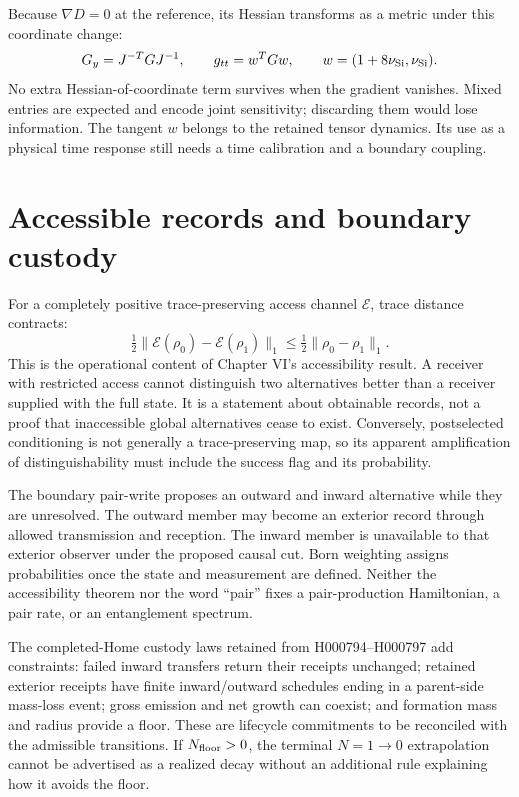 Because $\nabla D=0$ at the reference, its Hessian transforms as a metric under this coordinate change:
\begin{equation}
 G_y=J^{-T}GJ^{-1},\qquad
 g_{tt}=w^TGw,\qquad w=(1+8\nu_{\rm Si},\nu_{\rm Si}).
 \label{c7:metrictransport}
\end{equation}
No extra Hessian-of-coordinate term survives when the gradient vanishes. Mixed entries are expected and encode joint sensitivity; discarding them would lose information. The tangent $w$ belongs to the retained tensor dynamics. Its use as a physical time response still needs a time calibration and a boundary coupling.

\section{Accessible records and boundary custody}
For a completely positive trace-preserving access channel $\mathcal E$, trace distance contracts:
\begin{equation}
 \tfrac12\|\mathcal E(\rho_0)-\mathcal E(\rho_1)\|_1
 \le\tfrac12\|\rho_0-\rho_1\|_1.
 \label{c7:contraction}
\end{equation}
This is the operational content of Chapter VI's accessibility result. A receiver with restricted access cannot distinguish two alternatives better than a receiver supplied with the full state. It is a statement about obtainable records, not a proof that inaccessible global alternatives cease to exist. Conversely, postselected conditioning is not generally a trace-preserving map, so its apparent amplification of distinguishability must include the success flag and its probability.

The boundary pair-write proposes an outward and inward alternative while they are unresolved. The outward member may become an exterior record through allowed transmission and reception. The inward member is unavailable to that exterior observer under the proposed causal cut. Born weighting assigns probabilities once the state and measurement are defined. Neither the accessibility theorem nor the word ``pair'' fixes a pair-production Hamiltonian, a pair rate, or an entanglement spectrum.

The completed-Home custody laws retained from H000794--H000797 add constraints: failed inward transfers return their receipts unchanged; retained exterior receipts have finite inward/outward schedules ending in a parent-side mass-loss event; gross emission and net growth can coexist; and formation mass and radius provide a floor. These are lifecycle commitments to be reconciled with the admissible transitions. If $N_{\rm floor}>0$, the terminal $N=1\to0$ extrapolation cannot be advertised as a realized decay without an additional rule explaining how it avoids the floor.

